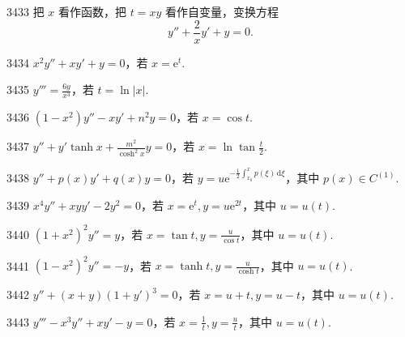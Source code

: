 \begin{prob}[S]{3433}
把 $x$ 看作函数，把 $t = xy$ 看作自变量，变换方程
\[
y'' + \frac{2}{x}y' + y = 0.
\]
\end{prob}


\begin{prob}[S]{3434}
$x^2 y'' + xy' + y = 0$，若 $x = \mathrm{e}^t$.
\end{prob}

\begin{prob}[S]{3435}
$y''' = \frac{6y}{x^3}$，若 $t = \ln |x|$.
\end{prob}

\begin{prob}[S]{3436}
$(1 - x^2)y'' - xy' + n^2 y = 0$，若 $x = \cos t$.
\end{prob}

\begin{prob}[S]{3437}
$y'' + y'\tanh x + \frac{m^2}{\cosh^2 x}y = 0$，若 $x = \ln\tan\frac{t}{2}$.
\end{prob}

\begin{prob}[S]{3438}
$y'' + p(x)y' + q(x)y = 0$，若 $y = u\mathrm{e}^{-\frac{1}{2}\int_{x_0}^x p(\xi)\,\mathrm{d}\xi}$，其中 $p(x) \in C^{(1)}$.
\end{prob}

\begin{prob}[S]{3439}
$x^4 y'' + xyy' - 2y^2 = 0$，若 $x = \mathrm{e}^t, y = u\mathrm{e}^{2t}$，其中 $u = u(t)$.
\end{prob}

\begin{prob}[S]{3440}
$(1 + x^2)^2 y'' = y$，若 $x = \tan t, y = \frac{u}{\cos t}$，其中 $u = u(t)$.
\end{prob}

\begin{prob}[S]{3441}
$(1 - x^2)^2 y'' = -y$，若 $x = \tanh t, y = \frac{u}{\cosh t}$，其中 $u = u(t)$.
\end{prob}

\begin{prob}[S]{3442}
$y'' + (x + y)(1 + y')^3 = 0$，若 $x = u + t, y = u - t$，其中 $u = u(t)$.
\end{prob}

\begin{prob}[S]{3443}
$y''' - x^3 y'' + xy' - y = 0$，若 $x = \frac{1}{t}, y = \frac{u}{t}$，其中 $u = u(t)$.
\end{prob}

